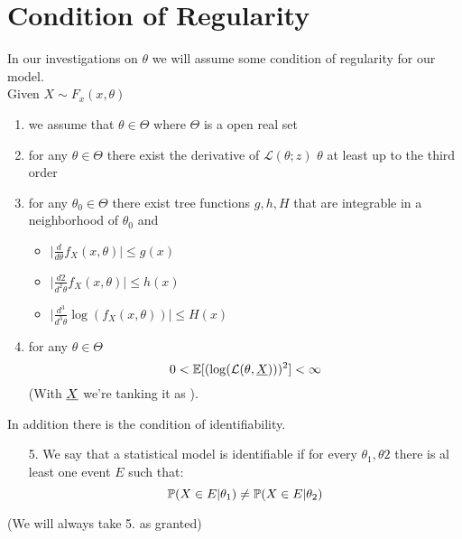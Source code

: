 \section{Condition of Regularity}
In our investigations on $\theta$ we will assume some condition of regularity for our model.\\
Given $X\sim F_x(x,\theta)$
\begin{enumerate}
	\item we assume that $\theta \in \Theta$ where $\Theta$  is a open real set
	\item for any $\theta \in \Theta$ there exist the  derivative of $\mathcal{L}(\theta;z)$ \wrt $\theta$ at least up to the third order
	\item for any $\theta_0 \in \Theta$ there exist tree functions $g,h,H$ that are integrable in a neighborhood of $\theta_0$  and 
	\begin{itemize}
		\item $\bigg| \frac{d}{d\theta} f_X(x,\theta) \bigg|\leq g(x)$
		\item $\bigg| \frac{d2}{d^2\theta} f_X(x,\theta) \bigg|\leq h(x)$
		\item $\bigg| \frac{d^3}{d^3\theta} \log(f_X(x,\theta)) \bigg|\leq H(x)$
	\end{itemize}
	\item for any $\theta \in \Theta$
	$$0<\mathbb{E}[(\log(\mathcal{L}(\theta, \underline X)))^2]<\infty$$
	(With $\underline X$ we're tanking it as \rv).
\end{enumerate}
In addition there is the condition of identifiability.
\begin{itemize}
	\item[5.] We say that a statistical model is identifiable if for every  $\theta_1,\theta2$ there is al least one event $E$ such that:
	$$\mathbb{P}(X\in E | \theta_1)\not =\mathbb{P}(X\in E | \theta_2)$$
\end{itemize}
(We will always take 5. as granted)
